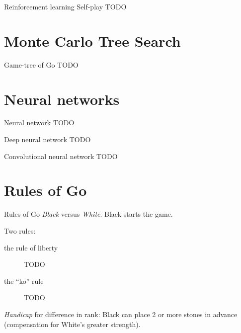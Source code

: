 \documentclass{beamer}
\newcommand{\todo}{\alert{TODO}}
\begin{document}
  \begin{frame}{Reinforcement learning}
    \alert{Self-play}
    \todo
  \end{frame}


  \section{Monte Carlo Tree Search}
  \begin{frame}{Game-tree of Go}
    \todo
  \end{frame}


  \section{Neural networks}
  \begin{frame}{Neural network}
    \todo
  \end{frame}

  \begin{frame}{Deep neural network}
    \todo
  \end{frame}

  \begin{frame}{Convolutional neural network}
    \todo
  \end{frame}


  \section{Rules of Go}
  \begin{frame}{Rules of Go}
    \emph{Black} versus \emph{White}.
    Black starts the game.

    \pause
    Two rules:
    \begin{description}
      \item [the rule of liberty] \todo
      \item [the ``ko'' rule] \todo
    \end{description}

    \pause
    \emph{Handicap} for difference in rank:
    Black can place 2 or more stones in advance (compensation for White's greater strength).
  \end{frame}
\end{document}
